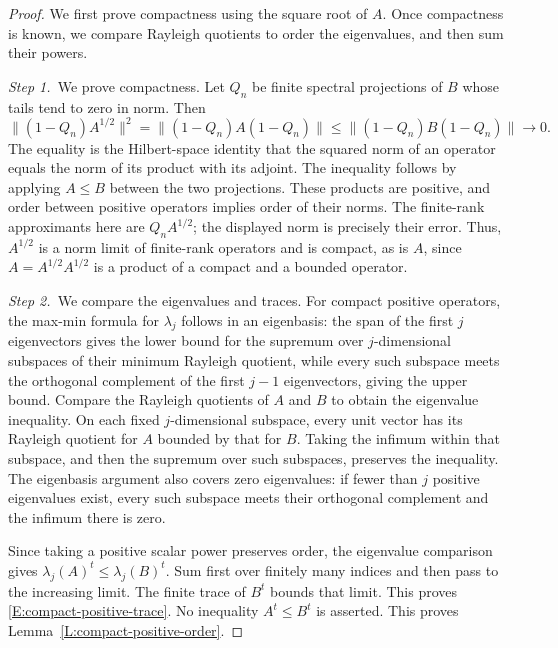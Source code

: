 \begin{proof}
  We first prove compactness using the square root of $A$. Once compactness is
  known, we compare Rayleigh quotients to order the eigenvalues, and then sum
  their powers.

  \medskip
  \noindent\textit{Step 1.~}We prove compactness.
  Let $Q_n$ be finite spectral projections of $B$ whose tails tend to zero in
  norm. Then
  \[
    \|(1-Q_n)A^{1/2}\|^2
    =\|(1-Q_n)A(1-Q_n)\|
    \le\|(1-Q_n)B(1-Q_n)\|\longrightarrow0.
  \]
  The equality is the Hilbert-space identity that the squared norm of an
  operator equals the norm of its product with its adjoint. The inequality
  follows by applying $A \le B$ between the two projections. These products
  are positive, and order between positive operators implies order of their
  norms.
  The finite-rank approximants here are $Q_nA^{1/2}$; the displayed norm
  is precisely their error.
  Thus, $A^{1/2}$ is a norm limit of finite-rank operators and is compact, as is
  $A$, since $A = A^{1/2}A^{1/2}$ is a product of a compact and a
  bounded operator.

  \medskip
  \noindent\textit{Step 2.~}We compare the eigenvalues and traces.
  For compact positive operators, the max-min formula for $\lambda_j$
  follows in an eigenbasis: the span of the first $j$ eigenvectors gives the
  lower bound for the supremum over $j$-dimensional subspaces of their minimum
  Rayleigh quotient, while every such subspace meets the orthogonal complement
  of the first $j-1$ eigenvectors, giving the upper bound. Compare the Rayleigh
  quotients of $A$ and $B$ to obtain the eigenvalue inequality.
  On each fixed $j$-dimensional subspace, every unit vector has its Rayleigh
  quotient for $A$ bounded by that for $B$. Taking the infimum within that
  subspace, and then the supremum over such subspaces, preserves the
  inequality. The eigenbasis argument also covers zero eigenvalues: if fewer
  than $j$ positive eigenvalues exist, every such subspace meets their
  orthogonal complement and the infimum there is zero.

  Since taking a positive scalar power preserves order, the eigenvalue
  comparison gives $\lambda_j(A)^t \le \lambda_j(B)^t$. Sum first
  over finitely many indices and then pass to the increasing limit. The finite
  trace of $B^t$ bounds that limit. This proves
  \eqref{E:compact-positive-trace}. No inequality $A^t
  \le B^t$ is asserted. This proves Lemma~\ref{L:compact-positive-order}.
\end{proof}

